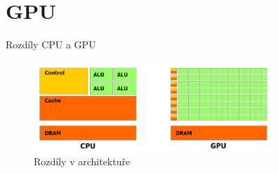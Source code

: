 \documentclass[compress,mathserif]{beamer}
\theoremstyle{definition}
\theoremstyle{plain}
\begin{document}
\section{GPU}

     \begin{frame}{Rozdíly CPU a GPU}
        \begin{figure}
            \includegraphics[width=90mm]{img/CPUGPU.PNG}
            \caption{Rozdíly v architektuře}
        \end{figure}
    \end{frame}
    
\end{document}
